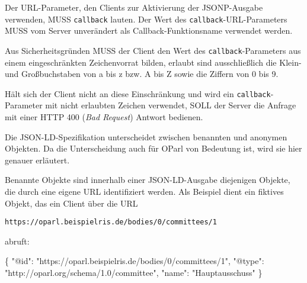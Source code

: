 \documentclass[,a4paper]{article}
\newenvironment{Shaded}{}{}
\newcommand{\DataTypeTok}[1]{\textcolor[rgb]{0.56,0.13,0.00}{{#1}}}
\newcommand{\StringTok}[1]{\textcolor[rgb]{0.25,0.44,0.63}{{#1}}}
\newcommand{\FunctionTok}[1]{\textcolor[rgb]{0.02,0.16,0.49}{{#1}}}
\begin{document}
Der URL-Parameter, den Clients zur Aktivierung der JSONP-Ausgabe
verwenden, MUSS \texttt{callback} lauten. Der Wert des
\texttt{callback}-URL-Parameters MUSS vom Server unverändert als
Callback-Funktionsname verwendet werden.

Aus Sicherheitsgründen MUSS der Client den Wert des
\texttt{callback}-Parameters aus einem eingeschränkten Zeichenvorrat
bilden, erlaubt sind ausschließlich die Klein- und Großbuchstaben von a
bis z bzw. A bis Z sowie die Ziffern von 0 bis 9.

Hält sich der Client nicht an diese Einschränkung und wird ein
\texttt{callback}-Parameter mit nicht erlaubten Zeichen verwendet, SOLL
der Server die Anfrage mit einer HTTP 400 (\emph{Bad Request}) Antwort
bedienen.


Die JSON-LD-Spezifikation unterscheidet zwischen benannten und anonymen
Objekten. Da die Unterscheidung auch für OParl von Bedeutung ist, wird
sie hier genauer erläutert.


Benannte Objekte sind innerhalb einer JSON-LD-Ausgabe diejenigen
Objekte, die durch eine eigene URL identifiziert werden. Als Beispiel
dient ein fiktives Objekt, das ein Client über die URL

\begin{verbatim}
https://oparl.beispielris.de/bodies/0/committees/1
\end{verbatim}

abruft:

\begin{Shaded}
\begin{Highlighting}[]
\FunctionTok{\{}
    \DataTypeTok{"@id"}\FunctionTok{:} \StringTok{"https://oparl.beispielris.de/bodies/0/committees/1"}\FunctionTok{,}
    \DataTypeTok{"@type"}\FunctionTok{:} \StringTok{"http://oparl.org/schema/1.0/committee"}\FunctionTok{,}
    \DataTypeTok{"name"}\FunctionTok{:} \StringTok{"Hauptausschuss"}
\FunctionTok{\}}
\end{Highlighting}
\end{Shaded}
\end{document}
